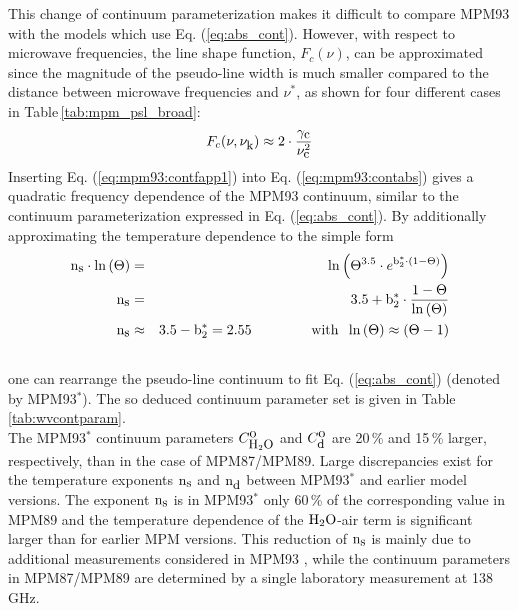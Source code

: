 This change of continuum parameterization makes it difficult 
to compare MPM93 with the models which use Eq. (\ref{eq:abs_cont}). 
However, with respect to microwave frequencies, the 
line shape function, $F_c(\nu)$, can be approximated since 
the magnitude of the pseudo-line width is much smaller compared to the 
distance between microwave frequencies and $\nu^*$, as 
shown for four different cases in Table\,\ref{tab:mpm_psl_broad}:
\begin{equation}
 \label{eq:mpm93:contfapp1}
 F_{c}(\nu,\nu_{\mbox{\rm \small k}}) \approx 2 \cdot \frac{\gamma_{\mbox{\rm \small c}}}{\nu_{\mbox{\rm \small c}}^2}
\end{equation}
Inserting Eq. (\ref{eq:mpm93:contfapp1}) into Eq. (\ref{eq:mpm93:contabs})
gives a quadratic frequency dependence of the MPM93 continuum,
similar to the continuum parameterization expressed in 
Eq. (\ref{eq:abs_cont}). By additionally approximating 
the temperature dependence to the simple form
\begin{eqnarray}
  \xs\cdot\ln{(\Theta)} & = & 
  \ln{\left(\Theta^{3.5} \cdot e^{\bzks\cdot(1-\Theta)}\right)}\nonumber\\
%
  \xs  & = & 3.5 +
  \bzks\cdot\frac{1-\Theta}{\ln{(\Theta)}}\nonumber\\
%
  \xs & \approx & 3.5 -\bzks = 2.55\hspace*{15mm}\mbox{with}\hspace*{2mm}
                 \ln{(\Theta)}\approx(\Theta-1)\\
\nonumber
\end{eqnarray}
%
one can rearrange the pseudo-line continuum to fit Eq. (\ref{eq:abs_cont})
(denoted by MPM93$^*$). The so deduced continuum parameter set is given in 
Table \ref{tab:wvcontparam}.\\
The MPM93$^*$ continuum parameters $C^{\mbox{\rm o}}_{\mbox{\rm \small H}_{2}\mbox{\rm \small O}}$ and $C^{\mbox{\rm o}}_{\mbox{\rm \small d}}$ are 20\,\% and 
15\,\% larger, respectively, than in the case of MPM87/MPM89. 
Large discrepancies exist for the temperature exponents ${\rm n}_{\mbox{\rm \small s}}$ 
and ${\rm n}_{\mbox{\rm \small d}}$ between MPM93$^*$ and earlier model versions. The 
exponent ${\rm n}_{\mbox{\rm \small s}}$ is in MPM93$^*$ only 60\,\% of the corresponding 
value in MPM89 and the temperature dependence of the $\mbox{H}_2\mbox{O}$-air 
term is significant larger than for earlier MPM versions.
This reduction of ${\rm n}_{\mbox{\rm \small s}}$ is mainly due to additional measurements 
considered in MPM93 \citep{beckerautler:46,godonetal:92}, 
while the continuum parameters in MPM87/MPM89 are determined 
by a single laboratory measurement at 138\,GHz.



